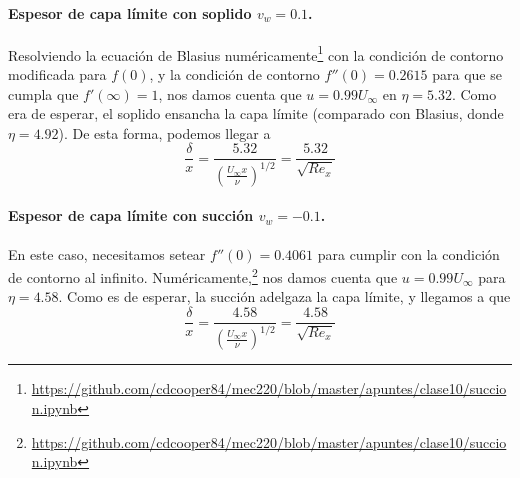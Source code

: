 \paragraph*{Espesor de capa límite con soplido $v_w=0.1$.}
Resolviendo la ecuación de Blasius numéricamente\footnote{\url{https://github.com/cdcooper84/mec220/blob/master/apuntes/clase10/succion.ipynb}} con la condición de contorno modificada para $f(0)$, y la condición de contorno $f''(0)=0.2615$ para que se cumpla que $f'(\infty)=1$, nos damos cuenta que $u=0.99U_\infty$ en $\eta=5.32$. 
Como era de esperar, el soplido ensancha la capa límite (comparado con Blasius, donde $\eta=4.92$). De esta forma, podemos llegar a 
%
\begin{equation}
\frac{\delta}{x}=\frac{5.32}{\left(\frac{U_\infty x}{\nu}\right)^{1/2}} = \frac{5.32}{\sqrt{Re_x}} 
\end{equation}

\paragraph*{Espesor de capa límite con succión $v_w=-0.1$.}
En este caso, necesitamos setear $f''(0) = 0.4061$ para cumplir con la condición de contorno al infinito.
Numéricamente,\footnote{\url{https://github.com/cdcooper84/mec220/blob/master/apuntes/clase10/succion.ipynb}} nos damos cuenta que $u=0.99U_\infty$ para $\eta=4.58$. Como es de esperar, la succión adelgaza la capa límite, y llegamos a que
%
\begin{equation}
\frac{\delta}{x}=\frac{4.58}{\left(\frac{U_\infty x}{\nu}\right)^{1/2}} = \frac{4.58}{\sqrt{Re_x}} 
\end{equation}
